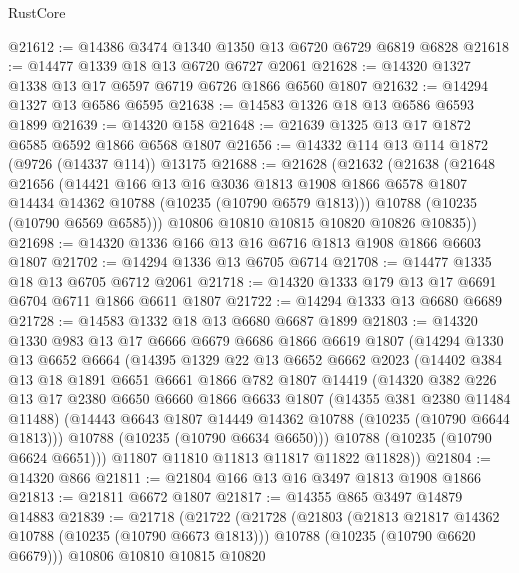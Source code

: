 \begin{lexlean}{RustCore}
\begin{coremodule}
@21612 := @14386 @3474 @1340 @1350 @13 @6720 @6729 @6819 @6828
@21618 := @14477 @1339 @18 @13 @6720 @6727 @2061
@21628 := @14320 @1327 @1338 @13 @17 @6597 @6719 @6726 @1866 @6560 @1807
@21632 := @14294 @1327 @13 @6586 @6595
@21638 := @14583 @1326 @18 @13 @6586 @6593 @1899
@21639 := @14320 @158
@21648 := @21639 @1325 @13 @17 @1872 @6585 @6592 @1866 @6568 @1807
@21656 := @14332 @114 @13 @114 @1872 (@9726 (@14337 @114)) @13175
@21688 := @21628
    (@21632
      (@21638
        (@21648
          @21656
          (@14421
            @166
            @13
            @16
            @3036
            @1813
            @1908
            @1866
            @6578
            @1807
            @14434
            @14362
            @10788
            (@10235 (@10790 @6579 @1813)))
          @10788
          (@10235 (@10790 @6569 @6585)))
        @10806
        @10810
        @10815
        @10820
        @10826
        @10835))
@21698 := @14320 @1336 @166 @13 @16 @6716 @1813 @1908 @1866 @6603 @1807
@21702 := @14294 @1336 @13 @6705 @6714
@21708 := @14477 @1335 @18 @13 @6705 @6712 @2061
@21718 := @14320 @1333 @179 @13 @17 @6691 @6704 @6711 @1866 @6611 @1807
@21722 := @14294 @1333 @13 @6680 @6689
@21728 := @14583 @1332 @18 @13 @6680 @6687 @1899
@21803 := @14320
    @1330
    @983
    @13
    @17
    @6666
    @6679
    @6686
    @1866
    @6619
    @1807
    (@14294
      @1330
      @13
      @6652
      @6664
      (@14395
        @1329
        @22
        @13
        @6652
        @6662
        @2023
        (@14402
          @384
          @13
          @18
          @1891
          @6651
          @6661
          @1866
          @782
          @1807
          @14419
          (@14320
            @382
            @226
            @13
            @17
            @2380
            @6650
            @6660
            @1866
            @6633
            @1807
            (@14355 @381 @2380 @11484 @11488)
            (@14443 @6643 @1807 @14449 @14362 @10788 (@10235 (@10790 @6644 @1813)))
            @10788
            (@10235 (@10790 @6634 @6650)))
          @10788
          (@10235 (@10790 @6624 @6651)))
        @11807
        @11810
        @11813
        @11817
        @11822
        @11828))
@21804 := @14320 @866
@21811 := @21804 @166 @13 @16 @3497 @1813 @1908 @1866
@21813 := @21811 @6672 @1807
@21817 := @14355 @865 @3497 @14879 @14883
@21839 := @21718
    (@21722
      (@21728
        (@21803
          (@21813 @21817 @14362 @10788 (@10235 (@10790 @6673 @1813)))
          @10788
          (@10235 (@10790 @6620 @6679)))
        @10806
        @10810
        @10815
        @10820

\end{coremodule}
\end{lexlean}
